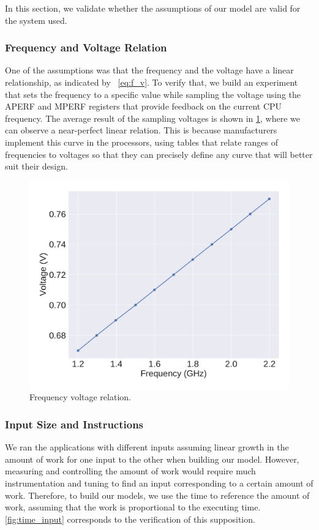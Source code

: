 In this section, we validate whether the assumptions of our model are valid for the system used.

\subsubsection{Frequency and Voltage Relation}
One of the assumptions was that the frequency and the voltage have a linear relationship, as indicated by ~\cref{eq:f_v}. To verify that, we build an experiment that sets the frequency to a specific value while sampling the voltage using the APERF and MPERF registers that provide feedback on the current CPU frequency. The average result of the sampling voltages is shown in  \cref{fig:freq_volt_rel}, where we can observe a near-perfect linear relation. This is because manufacturers implement this curve in the processors, using tables that relate ranges of frequencies to voltages so that they can precisely define any curve that will better suit their design.

\begin{figure}[H]
	\centering
	\captionsetup[subfigure]{justification=centering}
	\includegraphics[width=\columnwidth]{experiments/figures/freq_volt_rel.pdf}
	\caption{Frequency voltage relation.}
	\label{fig:freq_volt_rel}
\end{figure}

\subsubsection{Input Size and Instructions}
We ran the applications with different inputs assuming  linear growth in the amount of work for one input to the other when building our model. However, measuring and controlling the amount of work would require much instrumentation and tuning to find an input corresponding to a certain amount of work. Therefore, to build our models, we use the time to reference the amount of work, assuming that the work is proportional to the executing time. \cref{fig:time_input} corresponds to the verification of this supposition.


